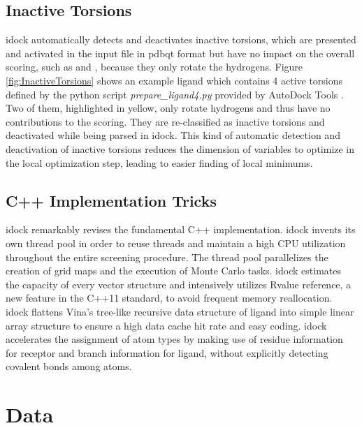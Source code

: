 \documentclass[10pt, conference, compsocconf]{../IEEEtran}
\begin{document}
\subsection{Inactive Torsions}

idock automatically detects and deactivates inactive torsions, which are presented and activated in the input file in pdbqt format but have no impact on the overall scoring, such as  and , because they only rotate the hydrogens. Figure \ref{fig:InactiveTorsions} shows an example ligand which contains 4 active torsions defined by the python script \textit{prepare\_ligand4.py} provided by AutoDock Tools \cite{785,596}. Two of them, highlighted in yellow, only rotate hydrogens and thus have no contributions to the scoring. They are re-classified as inactive torsions and deactivated while being parsed in idock. This kind of automatic detection and deactivation of inactive torsions reduces the dimension of variables to optimize in the local optimization step, leading to easier finding of local minimums.


\subsection{C++ Implementation Tricks}

idock remarkably revises the fundamental C++ implementation. idock invents its own thread pool in order to reuse threads and maintain a high CPU utilization throughout the entire screening procedure. The thread pool parallelizes the creation of grid maps and the execution of Monte Carlo tasks. idock estimates the capacity of every vector structure and intensively utilizes Rvalue reference, a new feature in the C++11 standard, to avoid frequent memory reallocation. idock flattens Vina's tree-like recursive data structure of ligand into simple linear array structure to ensure a high data cache hit rate and easy coding. idock accelerates the assignment of atom types by making use of residue information for receptor and branch information for ligand, without explicitly detecting covalent bonds among atoms.

\section{Data}
\end{document}
